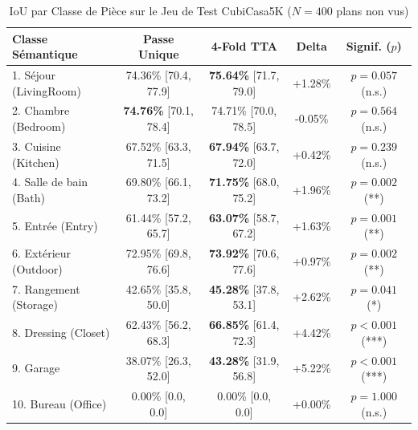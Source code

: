 \documentclass[11pt,a4paper]{report}
\begin{document}
\begin{table}[H]
\centering
\caption{IoU par Classe de Pièce sur le Jeu de Test CubiCasa5K ($N=400$ plans non vus)}
\label{tab:room_per_class}
\begin{tabular}{lcccc}
\toprule
\textbf{Classe Sémantique} & \textbf{Passe Unique} & \textbf{4-Fold TTA} & \textbf{Delta} & \textbf{Signif. ($p$)} \\
\midrule
1. Séjour (LivingRoom)   & 74.36\% [70.4, 77.9] & \textbf{75.64\%} [71.7, 79.0] & +1.28\% & $p = 0.057$ (n.s.) \\
2. Chambre (Bedroom)     & \textbf{74.76\%} [70.1, 78.4] & 74.71\% [70.0, 78.5] & -0.05\% & $p = 0.564$ (n.s.) \\
3. Cuisine (Kitchen)     & 67.52\% [63.3, 71.5] & \textbf{67.94\%} [63.7, 72.0] & +0.42\% & $p = 0.239$ (n.s.) \\
4. Salle de bain (Bath)  & 69.80\% [66.1, 73.2] & \textbf{71.75\%} [68.0, 75.2] & +1.96\% & $p = 0.002$ (**) \\
5. Entrée (Entry)        & 61.44\% [57.2, 65.7] & \textbf{63.07\%} [58.7, 67.2] & +1.63\% & $p = 0.001$ (**) \\
6. Extérieur (Outdoor)   & 72.95\% [69.8, 76.6] & \textbf{73.92\%} [70.6, 77.6] & +0.97\% & $p = 0.002$ (**) \\
7. Rangement (Storage)   & 42.65\% [35.8, 50.0] & \textbf{45.28\%} [37.8, 53.1] & +2.62\% & $p = 0.041$ (*) \\
8. Dressing (Closet)     & 62.43\% [56.2, 68.3] & \textbf{66.85\%} [61.4, 72.3] & +4.42\% & $p < 0.001$ (***) \\
9. Garage                & 38.07\% [26.3, 52.0] & \textbf{43.28\%} [31.9, 56.8] & +5.22\% & $p < 0.001$ (***) \\
10. Bureau (Office)      & 0.00\% [0.0, 0.0]   & 0.00\% [0.0, 0.0]             & +0.00\% & $p = 1.000$ (n.s.) \\
\bottomrule
\end{tabular}
\end{table}
\end{document}
